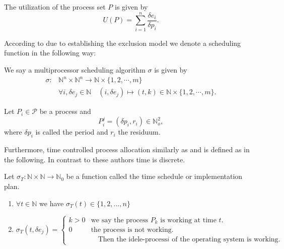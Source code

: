 \begin{definition}
The utilization of the process set $P$ is given by 
	\begin{equation}
	U(P)= \sum_{i=1}^n \frac{\delta e_i}{\delta p_i}.
	\end{equation}
\end{definition}

According to \cite{B97} due to establishing the exclusion model we denote  a scheduling function in the following way:

\begin{definition}
We say a multiprocessor scheduling algorithm $\sigma$ is given by 
	\begin{align} 
	\sigma: &\mathbb{N}^n \times \mathbb{N}^n \longrightarrow  \mathbb{N} \times \{1,2,\cdots, m\} \\
	&\forall i, \delta e_j \in  \mathbb{N} \quad (i ,\delta e_j)  \mapsto (t,k) \in \mathbb{N}\times \{1,2,\cdots,m\}. 
	\end{align}
\end{definition}


\begin{definition}
Let $P_i\in \mathcal{P}$ be a process and 
\begin{equation}
P^j_i = ( \delta p_i, r_i) \in \mathbb{N}_o^2,  
\end{equation}
where $\delta p_i$ is called the period and $r_i$ the residuum. 
\end{definition}
Furthermore, time controlled process allocation similarly as \cite{B97} and \cite[p. 34]{K} is defined as in the following. In contrast to these authors time is discrete.

\begin{definition}
Let $\sigma_T: \mathbb{N} \times \mathbb{N} \rightarrow \mathbb{N}_0$ be a function called the time schedule or implementation plan.
\begin{enumerate}
\item $\forall t \in \mathbb{N}$ we have $\sigma_T(t)\in \{1,2,...,n\}$
\item \begin{equation}
		\sigma_T(t,\delta e_j) =
		\begin{cases}
			k > 0 & \text{we say the process $P_k$ is working at time $t$.}\\
			0 & \text{the process is not working.}\\
			  &\quad  \text{Then the idele-process$i$ of the operating system is working.}
		\end{cases}       
\end{equation}
\end{enumerate}
\end{definition}

